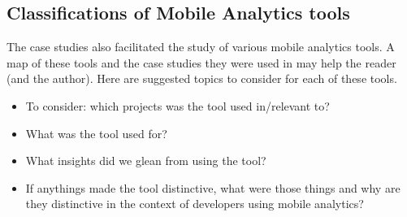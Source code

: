 \subsection{Classifications of Mobile Analytics tools}
The case studies also facilitated the study of various mobile analytics tools. A map of these tools and the case studies they were used in may help the reader (and the author). Here are suggested topics to consider for each of these tools.
\begin{itemize}
    \itemsep0em
    \item To consider: which projects was the tool used in/relevant to?
    \item What was the tool used for?
    \item What insights did we glean from using the tool?
    \item If anythings made the tool distinctive, what were those things and why are they distinctive in the context of developers using mobile analytics?
\end{itemize}

